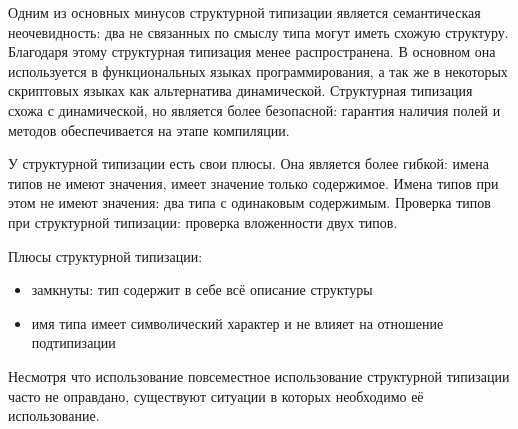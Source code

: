 Одним из основных минусов структурной типизации является семантическая неочевидность: два не связанных по смыслу типа могут иметь схожую структуру. Благодаря этому структурная типизация менее распространена. В основном она используется в функциональных языках программирования, а так же в некоторых скриптовых языках как альтернатива динамической. Структурная типизация схожа с динамической, но является более безопасной: гарантия наличия полей и методов обеспечивается на этапе компиляции.

У структурной типизации есть свои плюсы. Она является более гибкой: имена типов не имеют значения, имеет значение только содержимое. Имена типов при этом не имеют значения: два типа с одинаковым содержимым. Проверка типов при структурной типизации: проверка вложенности двух типов.

Плюсы структурной типизации:
\begin{itemize}
    \item замкнуты: тип содержит в себе всё описание структуры
    \item имя типа имеет символический характер и не влияет на отношение подтипизации
\end{itemize}

Несмотря что использование повсеместное использование структурной типизации часто не оправдано, существуют ситуации в которых необходимо её использование.
